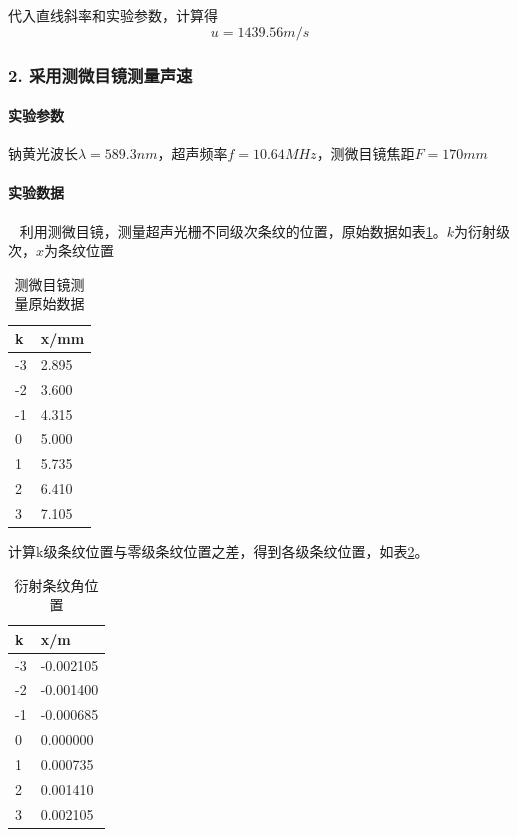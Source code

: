 \documentclass[12pt,a4paper,UTF8]{ctexart}
\begin{document}
		代入直线斜率和实验参数，计算得
		$$
		u = 1439.56 m/s
		$$

		
	\subsubsection*{2. 采用测微目镜测量声速}
		\paragraph{实验参数} 钠黄光波长$\lambda = 589.3 nm$，超声频率$f = 10.64 MHz$，测微目镜焦距$F = 170mm$
		\paragraph{实验数据}~
		\newline
		\indent
		利用测微目镜，测量超声光栅不同级次条纹的位置，原始数据如表\ref{tab:3}。$k$为衍射级次，$x$为条纹位置
		\begin{table}[htbp]
			\centering
			\begin{tabular}{|l|l|}
			\hline
				k & x/mm \\ \hline
				-3 & 2.895 \\ \hline
				-2 & 3.600 \\ \hline
				-1 & 4.315 \\ \hline
				0 & 5.000 \\ \hline
				1 & 5.735 \\ \hline
				2 & 6.410 \\ \hline
				3 & 7.105 \\ \hline
			\end{tabular}
			\caption{测微目镜测量原始数据}
			\label{tab:3}
		\end{table}

		计算k级条纹位置与零级条纹位置之差，得到各级条纹位置，如表\ref{tab:4}。
		\begin{table}[htbp]
			\centering
			\begin{tabular}{|l|l|}
			\hline
				k & x/m \\ \hline
				-3 & -0.002105 \\ \hline
				-2 & -0.001400 \\ \hline
				-1 & -0.000685 \\ \hline
				0 & 0.000000 \\ \hline
				1 & 0.000735 \\ \hline
				2 & 0.001410 \\ \hline
				3 & 0.002105 \\ \hline
			\end{tabular}
			\caption{衍射条纹角位置}
			\label{tab:4}
		\end{table}
		
\end{document}
